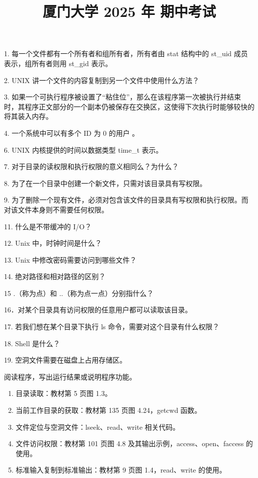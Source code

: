 \documentclass[fontset=exam]{exam-zh}
\title{厦门大学 2025 年 期中考试}
\begin{document}
\maketitle
{}
1. 每一个文件都有一个所有者和组所有者，所有者由 stat 结构中的 st\_uid 成员表示，组所有者则用 st\_gid 表示。

2. UNIX 讲一个文件的内容复制到另一个文件中使用什么方法？

3. 如果一个可执行程序被设置了``粘住位''，那么在该程序第一次被执行并结束时，其程序正文部分的一个副本仍被保存在交换区，这使得下次执行时能够较快的将其装入内存。

4. 一个系统中可以有多个 ID 为 0 的用户 。

6. UNIX 内核提供的时间以数据类型 time\_t 表示。

7. 对于目录的读权限和执行权限的意义相同么？为什么？

8. 为了在一个目录中创建一个新文件，只需对该目录具有写权限。

9. 为了删除一个现有文件，必须对包含该文件的目录具有写权限和执行权限。而对该文件本身则不需要任何权限。

11. 什么是不带缓冲的 I/O？

12. Unix 中，时钟时间是什么？

13. Unix 中修改密码需要访问到哪些文件？

14. 绝对路径和相对路径的区别？

15 .（称为点）和 ..（称为点一点）分别指什么？

16．对某个目录具有访问权限的任意用户都可以读取该目录。

17. 若我们想在某个目录下执行 ls 命令，需要对这个目录有什么权限？

18. Shell 是什么？

19. 空洞文件需要在磁盘上占用存储区。

\par{}\smallskip

阅读程序，写出运行结果或说明程序功能。

\begin{enumerate}
\def\labelenumi{\arabic{enumi}.}
\item
  目录读取：教材第 5 页图 1.3。
\item
  当前工作目录的获取：教材第 135 页图 4.24，getcwd 函数。
\item
  文件定位与空洞文件：lseek、read、write 相关代码。
\item
  文件访问权限：教材第 101 页图 4.8 及其输出示例，access、open、faccess 的使用。
\item
  标准输入复制到标准输出：教材第 9 页图 1.4，read、write 的使用。
\end{enumerate}
\end{document}
